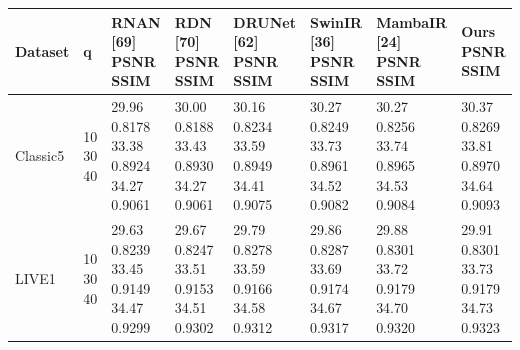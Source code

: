 \begin{tabular}{llllllll}
\toprule
Dataset & q & RNAN [69] PSNR SSIM & RDN [70] PSNR SSIM & DRUNet [62] PSNR SSIM & SwinIR [36] PSNR SSIM & MambaIR [24] PSNR SSIM & Ours PSNR SSIM \\
\midrule
Classic5 & 10 30 40 & 29.96 0.8178 33.38 0.8924 34.27 0.9061 & 30.00 0.8188 33.43 0.8930 34.27 0.9061 & 30.16 0.8234 33.59 0.8949 34.41 0.9075 & 30.27 0.8249 33.73 0.8961 34.52 0.9082 & 30.27 0.8256 33.74 0.8965 34.53 0.9084 & 30.37 0.8269 33.81 0.8970 34.64 0.9093 \\
LIVE1 & 10 30 40 & 29.63 0.8239 33.45 0.9149 34.47 0.9299 & 29.67 0.8247 33.51 0.9153 34.51 0.9302 & 29.79 0.8278 33.59 0.9166 34.58 0.9312 & 29.86 0.8287 33.69 0.9174 34.67 0.9317 & 29.88 0.8301 33.72 0.9179 34.70 0.9320 & 29.91 0.8301 33.73 0.9179 34.73 0.9323 \\
\bottomrule
\end{tabular}
